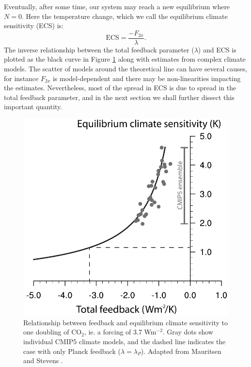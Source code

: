\documentclass[12pt]{book}
\begin{document}
Eventually, after some time, our system may reach a new equilibrium where $N=0$. Here the temperature change, which we call the equilibrium climate sensitivity (ECS) is:
\begin{equation}
\textrm{ECS} = \frac{-F_{2x}}{\lambda}.
\end{equation}
The inverse relationship between the total feedback parameter ($\lambda$) and ECS is plotted as the black curve in Figure \ref{fig:feedback_vs_ECS} along with estimates from complex climate models. %
The scatter of models around the theoretical line can have several causes, for instance $F_{2x}$ is model-dependent and there may be non-linearities impacting the estimates. Nevertheless, most of the spread in ECS is due to spread in the total feedback parameter, and in the next section we shall further dissect this important quantity.%

\begin{figure}
	\begin{center}
		\includegraphics[width=8 cm]{../external_figures/Feedback_vs_ECS.pdf}
	\end{center}
	\caption{ Relationship between feedback and equilibrium climate sensitivity to one doubling of CO$_2$, ie. a forcing of 3.7 Wm$^{-2}$. Gray dots show individual CMIP5 climate models, and the dashed line indicates the case with only Planck feedback ($\lambda=\lambda_P$). Adapted from Mauritsen and Stevens \cite{Mauritsen2015}.} 
	\label{fig:feedback_vs_ECS}
\end{figure}
\end{document}
